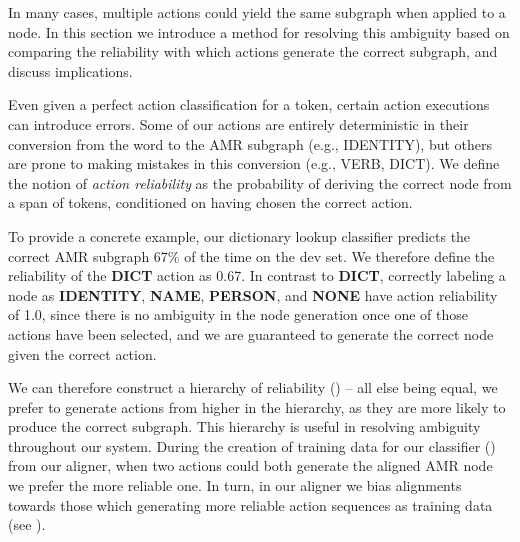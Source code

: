 \documentclass[11pt]{article}
\begin{document}
In many cases, multiple actions could yield the same subgraph when applied to a node.
In this section we introduce a method for resolving this ambiguity based on comparing 
the reliability with which actions generate the correct subgraph, and discuss implications.


Even given a perfect action classification for a token, certain action executions can introduce errors.
Some of our actions are entirely deterministic in their conversion
  from the word to the AMR subgraph (e.g., IDENTITY), but others are prone to
  making mistakes in this conversion (e.g., VERB, DICT).
We define the 
  notion of \textit{action reliability} as the probability of deriving the correct node from a span of tokens,
  conditioned on having chosen the correct action.

To provide a concrete example, our dictionary lookup classifier predicts the correct
  AMR subgraph 67\% of the time on the dev set.
We therefore define the reliability of the \textbf{DICT} action as 0.67.
In contrast to \textbf{DICT}, correctly labeling a node as \textbf{IDENTITY}, \textbf{NAME}, \textbf{PERSON}, and \textbf{NONE} have 
  action reliability of 1.0, since there is no ambiguity in the node generation 
  once one of those actions have been selected, 
  and we are guaranteed to generate the correct node given the correct action.

We can therefore construct a hierarchy of reliability () -- all else being equal, we
  prefer to generate actions from higher in the hierarchy, as they are more likely
  to produce the correct subgraph.
This hierarchy is useful in resolving ambiguity throughout our system. 
During the creation of training data for our classifier () from our aligner, 
  when two actions could both generate the aligned AMR node we prefer the more reliable one.
In turn, in our aligner we bias alignments towards those which generating 
  more reliable action sequences as training data (see ).
\end{document}
